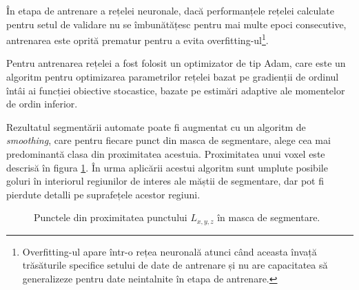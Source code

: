 În etapa de antrenare a rețelei neuronale, dacă performanțele rețelei calculate pentru setul de validare nu se îmbunătățesc pentru mai multe epoci consecutive, antrenarea este oprită prematur pentru a evita overfitting-ul\footnote{Overfitting-ul apare într-o rețea neuronală atunci când aceasta învață trăsăturile specifice setului de date de antrenare și nu are capacitatea să generalizeze pentru date neintalnite în etapa de antrenare.}.

Pentru antrenarea rețelei a fost folosit un optimizator de tip Adam\cite{https://doi.org/10.48550/arxiv.1412.6980}, care este un algoritm pentru optimizarea parametrilor rețelei bazat pe gradienții de ordinul întâi ai funcției obiective stocastice, bazate pe estimări adaptive ale momentelor de ordin inferior.

Rezultatul segmentării automate poate fi augmentat cu un algoritm de \textit{smoothing}, care pentru fiecare punct din masca de segmentare, alege cea mai predominantă clasa din proximitatea acestuia. Proximitatea unui voxel este descrisă în figura \ref{fig:smoothing}. În urma aplicării acestui algoritm sunt umplute posibile goluri în interiorul regiunilor de interes ale măștii de segmentare, dar pot fi pierdute detalli pe suprafețele acestor regiuni.

\begin{figure}[!htb]
\centering
\begin{center}
\end{center}
\caption{Punctele din proximitatea punctului $L_{x,y,z}$ în masca de segmentare.}
\label{fig:smoothing}
\end{figure}


